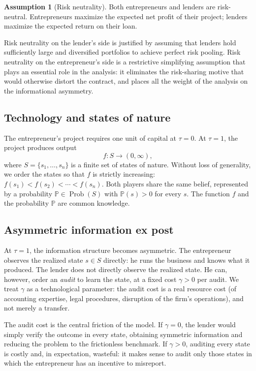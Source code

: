 \documentclass[11pt,a4paper,oneside]{book}
\renewcommand{\P}{\mathbb{P}}
\DeclareMathOperator{\Prob}{Prob}
\theoremstyle{plain}
\theoremstyle{definition}
\newtheorem{assumption}[theorem]{Assumption}
\theoremstyle{remark}
\numberwithin{equation}{chapter}
\begin{document}
\begin{assumption}[Risk neutrality]\label{ass:GH-RN}
Both entrepreneurs and lenders are risk-neutral.
Entrepreneurs maximize the expected net profit of their project; lenders maximize the expected return on their loan.
\end{assumption}

Risk neutrality on the lender's side is justified by assuming that lenders hold sufficiently large and diversified portfolios to achieve perfect risk pooling.
Risk neutrality on the entrepreneur's side is a restrictive simplifying assumption that plays an essential role in the analysis: it eliminates the risk-sharing motive that would otherwise distort the contract, and places all the weight of the analysis on the informational asymmetry.

\subsection{Technology and states of nature}

The entrepreneur's project requires one unit of capital at $\tau = 0$.
At $\tau = 1$, the project produces output
\begin{equation*}
  f : S \longrightarrow (0, \infty),
\end{equation*}
where $S = \{s_1, \ldots, s_n\}$ is a finite set of states of nature.
Without loss of generality, we order the states so that $f$ is strictly increasing: $f(s_1) < f(s_2) < \cdots < f(s_n)$.
Both players share the same belief, represented by a probability $\P \in \Prob(S)$ with $\P(s) > 0$ for every $s$.
The function $f$ and the probability $\P$ are common knowledge.

\subsection{Asymmetric information ex post}

At $\tau = 1$, the information structure becomes asymmetric.
The entrepreneur observes the realized state $s \in S$ directly: he runs the business and knows what it produced.
The lender does not directly observe the realized state.
He can, however, order an \emph{audit} to learn the state, at a fixed cost $\gamma > 0$ per audit.
We treat $\gamma$ as a technological parameter: the audit cost is a real resource cost (of accounting expertise, legal procedures, disruption of the firm's operations), and not merely a transfer.

The audit cost is the central friction of the model.
If $\gamma = 0$, the lender would simply verify the outcome in every state, obtaining symmetric information and reducing the problem to the frictionless benchmark.
If $\gamma > 0$, auditing every state is costly and, in expectation, wasteful: it makes sense to audit only those states in which the entrepreneur has an incentive to misreport.
\end{document}
